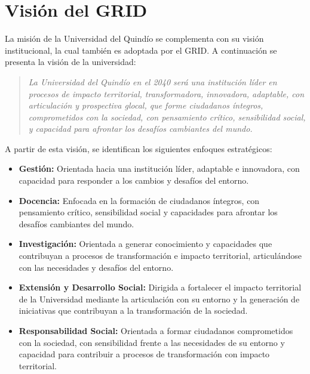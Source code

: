 \section{Visión del \texorpdfstring{\ac{GRID}}{GRID}}

La misión de la Universidad del Quindío se complementa con su visión institucional, la cual también es adoptada por el \ac{GRID}. A continuación se presenta la visión de la universidad:

\begin{quote}
	\textit{La Universidad del Quindío en el 2040 será una institución líder en procesos de impacto territorial, transformadora, innovadora, adaptable, con articulación y prospectiva glocal, que forme ciudadanos íntegros, comprometidos con la sociedad, con pensamiento crítico, sensibilidad social, y capacidad para afrontar los desafíos cambiantes del mundo. \citep{uniquindio2026}}
\end{quote}

A partir de esta visión, se identifican los siguientes enfoques estratégicos:

\begin{itemize}
	\item \textbf{Gestión:} Orientada hacia una institución líder, adaptable e innovadora, con capacidad para responder a los cambios y desafíos del entorno.

	\item \textbf{Docencia:} Enfocada en la formación de ciudadanos íntegros, con pensamiento crítico, sensibilidad social y capacidades para afrontar los desafíos cambiantes del mundo.

	\item \textbf{Investigación:} Orientada a generar conocimiento y capacidades que contribuyan a procesos de transformación e impacto territorial, articulándose con las necesidades y desafíos del entorno.

	\item \textbf{Extensión y Desarrollo Social:} Dirigida a fortalecer el impacto territorial de la Universidad mediante la articulación con su entorno y la generación de iniciativas que contribuyan a la transformación de la sociedad.

	\item \textbf{Responsabilidad Social:} Orientada a formar ciudadanos comprometidos con la sociedad, con sensibilidad frente a las necesidades de su entorno y capacidad para contribuir a procesos de transformación con impacto territorial.
\end{itemize}
